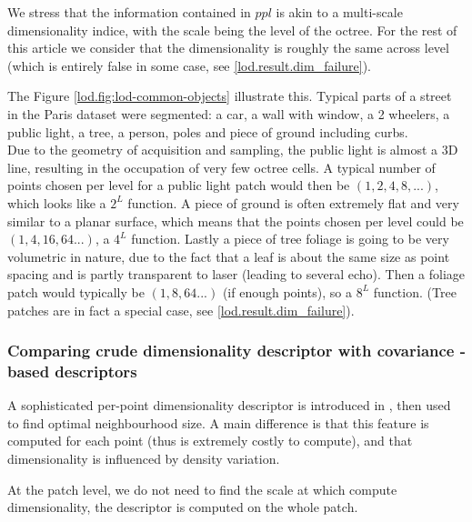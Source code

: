 		We stress that the information contained in $ppl$ is akin to a multi-scale dimensionality indice,
		with the scale being the level of the octree.
		For the rest of this article we consider that the dimensionality is roughly the same across level 
		 (which is entirely false in some case, see \ref{lod.result.dim_failure}).
		
		The Figure \ref{lod.fig:lod-common-objects} illustrate this. Typical parts of a street in the Paris dataset were segmented: a car, a wall with window, a 2 wheelers, a public light, a tree, a person, poles and piece of ground including curbs.
		\\
		Due to the geometry of acquisition and sampling, the public light is almost a 3D line, resulting in the occupation of very few octree cells.
		A typical number of points chosen per level for a public light patch would then be $(1,2,4,8,...)$, which looks like a $2^L$ function.
		A piece of ground is often extremely flat and very similar to a planar surface,
		which means that the points chosen per level could be $(1,4,16,64...)$, a $4^L$ function.
		Lastly a piece of tree foliage is going to be very volumetric in nature,
		due to the fact that a leaf is about the same size as point spacing and is partly transparent to laser (leading to several echo).
		Then a foliage patch would typically be $(1,8,64...)$ (if enough points), so a $8^L$ function.
		(Tree patches are in fact a special case, see \ref{lod.result.dim_failure}).
		
				
		\subsubsection{Comparing crude dimensionality descriptor with covariance - based descriptors}
		
		A sophisticated per-point dimensionality descriptor is introduced in \cite{Demantke2014, Weinmann2015}, then used to find optimal neighbourhood size.
		A main difference is that this feature is computed for each point (thus is extremely costly to compute), and that dimensionality is influenced by density variation.
			 
		At the patch level, we do not need to find the scale at which compute dimensionality,	the descriptor is computed on the whole patch.
		
